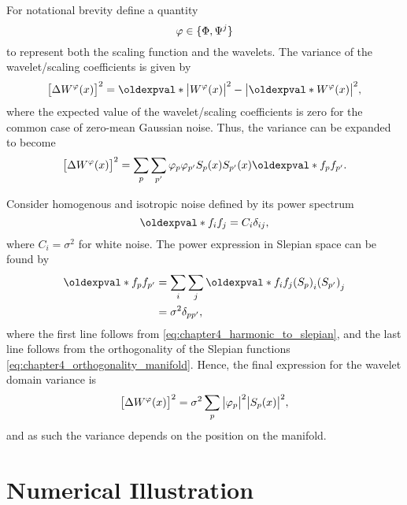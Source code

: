 For notational brevity define a quantity
%
\begin{equation}
	\varphi \in \{\Phi,\Psi^{j}\}
\end{equation}
%
to represent both the scaling function and the wavelets.
The variance of the wavelet/scaling coefficients is given by
%
\begin{equation}
	\variance{\mesh{W^{\varphi}}}
	= \expval{\abs{\mesh{W^{\varphi}}}^{2}}
	-\abs{\expval{\mesh{W^{\varphi}}}}^{2},
\end{equation}
%
where the expected value of the wavelet/scaling coefficients is zero for the common case of zero-mean Gaussian noise.
Thus, the variance can be expanded to become
%
\begin{equation}\label{eq:chapter4_slepian_isotropic_noise}
	\variance{\mesh{W^{\varphi}}}
	= \slepianSum \slepianSum['] \slepian{\varphi} \slepian[']{\varphi} \mesh{\slepian{S}} \mesh{\slepian[']{S}} \expval{\slepian{f} \slepian[']{f}}.
\end{equation}

Consider homogenous and isotropic noise defined by its power spectrum
%
\begin{equation}
	\expval{f_{i} f_{j}}
	= C_{i} \delta_{i j},
\end{equation}
%
where \(C_{i} = \sigma^{2}\) for white noise.
The power expression in Slepian space can be found by
%
\begin{align}
	\expval{\slepian{f} \slepian[']{f}}
	 & = \sum\limits_{i} \sum\limits_{j} \expval{f_{i} f_{j}} \empty{} {(\slepian{S})}_{i} {(\slepian[']{S})}_{j} \nonumber \\
	 & = \sigma^{2} \delta_{pp'},
\end{align}
%
where the first line follows from \cref{eq:chapter4_harmonic_to_slepian}, and the last line follows from the orthogonality of the Slepian functions \cref{eq:chapter4_orthogonality_manifold}.
Hence, the final expression for the wavelet domain variance is
%
\begin{equation}
	{\big[\Delta W^{\varphi}(x)\big]}^{2}
	= \sigma^{2} \sum\limits_{p} \big\lvert{\varphi}_{p}\big\rvert^{2} \big\lvert{S}_{p}(x)\big\rvert^{2},
\end{equation}
%
and as such the variance depends on the position on the manifold.

\section{Numerical Illustration}

